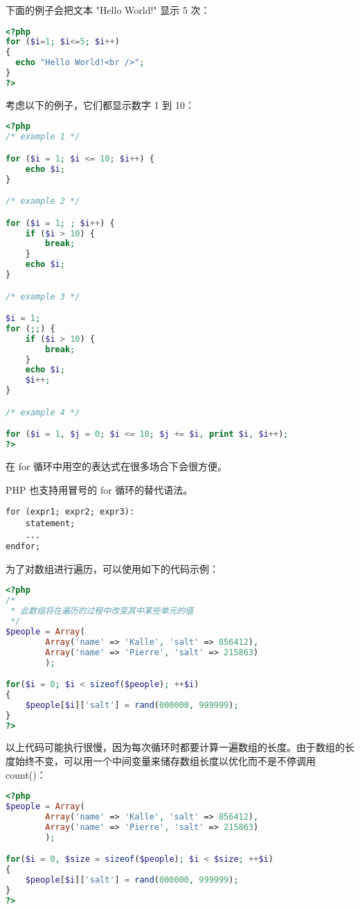 下面的例子会把文本 "Hello World!" 显示 5 次：

\begin{lstlisting}[language=PHP]
<?php
for ($i=1; $i<=5; $i++)
{
  echo "Hello World!<br />";
}
?>
\end{lstlisting}

考虑以下的例子，它们都显示数字 1 到 10：

\begin{lstlisting}[language=PHP]
<?php
/* example 1 */

for ($i = 1; $i <= 10; $i++) {
    echo $i;
}

/* example 2 */

for ($i = 1; ; $i++) {
    if ($i > 10) {
        break;
    }
    echo $i;
}

/* example 3 */

$i = 1;
for (;;) {
    if ($i > 10) {
        break;
    }
    echo $i;
    $i++;
}

/* example 4 */

for ($i = 1, $j = 0; $i <= 10; $j += $i, print $i, $i++);
?>
\end{lstlisting}


在 for 循环中用空的表达式在很多场合下会很方便。

PHP 也支持用冒号的 for 循环的替代语法。


\begin{verbatim}
for (expr1; expr2; expr3):
    statement;
    ...
endfor;
\end{verbatim}

为了对数组进行遍历，可以使用如下的代码示例：

\begin{lstlisting}[language=PHP]
<?php
/*
 * 此数组将在遍历的过程中改变其中某些单元的值
 */
$people = Array(
        Array('name' => 'Kalle', 'salt' => 856412), 
        Array('name' => 'Pierre', 'salt' => 215863)
        );

for($i = 0; $i < sizeof($people); ++$i)
{
    $people[$i]['salt'] = rand(000000, 999999);
}
?>
\end{lstlisting}

以上代码可能执行很慢，因为每次循环时都要计算一遍数组的长度。由于数组的长度始终不变，可以用一个中间变量来储存数组长度以优化而不是不停调用 count()：

\begin{lstlisting}[language=PHP]
<?php
$people = Array(
        Array('name' => 'Kalle', 'salt' => 856412), 
        Array('name' => 'Pierre', 'salt' => 215863)
        );

for($i = 0, $size = sizeof($people); $i < $size; ++$i)
{
    $people[$i]['salt'] = rand(000000, 999999);
}
?>
\end{lstlisting}


